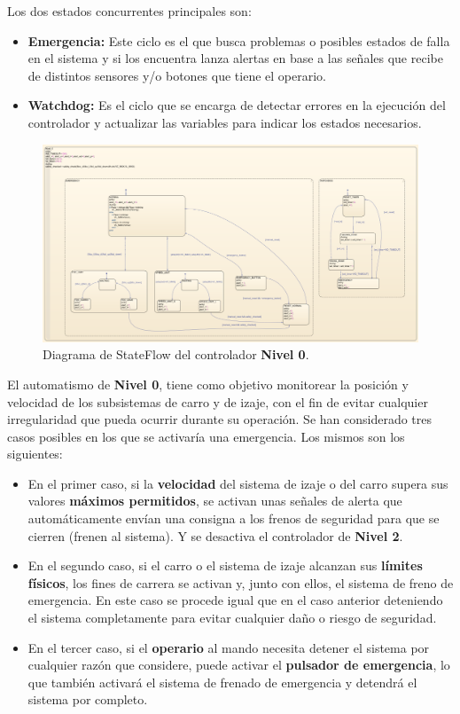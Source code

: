 \documentclass[11pt]{article}
\begin{document}
Los dos estados concurrentes principales son:
\begin{itemize}
	\item \textbf{Emergencia:} Este ciclo es el que busca problemas o posibles estados de falla en el sistema y si los encuentra lanza alertas en base a las señales que recibe de distintos sensores y/o botones que tiene el operario.
	\item \textbf{Watchdog:} Es el ciclo que se encarga de detectar errores en la ejecución del controlador y actualizar las variables para indicar los estados necesarios.
\end{itemize}

\begin{figure}[!h]
	\centering
	\includegraphics[width=1\textwidth]{images/imagen_26_nivel_0.png}
	\caption{Diagrama de StateFlow del controlador \textbf{Nivel 0}.}
	\label{fig:nivel_0}
\end{figure}

El automatismo de \textbf{Nivel 0}, tiene como objetivo monitorear la posición y velocidad de los subsistemas de carro y de izaje, con el fin de evitar cualquier irregularidad que pueda ocurrir durante su operación. Se han considerado tres casos posibles en los que se activaría una emergencia. Los mismos son los siguientes:

\begin{itemize}
	\item En el primer caso, si la \textbf{velocidad} del sistema de izaje o del carro supera sus valores \textbf{máximos permitidos}, se activan unas señales de alerta que automáticamente envían una consigna a los frenos de seguridad para que se cierren (frenen al sistema). Y se desactiva el controlador de \textbf{Nivel 2}.

	\item En el segundo caso, si el carro o el sistema de izaje alcanzan sus \textbf{límites físicos}, los fines de carrera se activan y, junto con ellos, el sistema de freno de emergencia. En este caso se procede igual que en el caso anterior deteniendo el sistema completamente para evitar cualquier daño o riesgo de seguridad.
	
	\item En el tercer caso, si el \textbf{operario} al mando necesita detener el sistema por cualquier razón que considere, puede activar el \textbf{pulsador de emergencia}, lo que también activará el sistema de frenado de emergencia y detendrá el sistema por completo.
\end{itemize}
\end{document}
